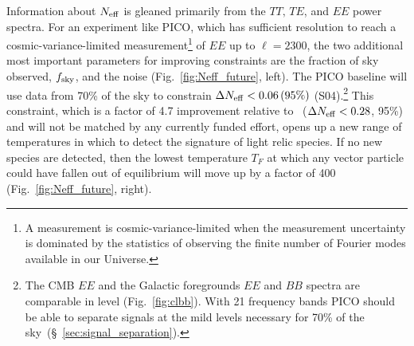 \documentclass[PICOReport.tex]{subfiles}
\begin{document}
Information about ${N_{\rm eff}}$ is gleaned primarily from the $TT,\, TE$, and $EE$ power spectra. For an experiment like PICO, which has sufficient resolution to reach a cosmic-variance-limited measurement\footnote{A measurement is cosmic-variance-limited when the measurement uncertainty is dominated by the statistics of observing the finite number of Fourier modes available in our Universe.} of $EE$ up to $\ell =2300$, the two additional most important parameters for improving constraints are the fraction of sky observed, $f_{\rm sky}$, and the noise (Fig.~\ref{fig:Neff_future}, left). The PICO baseline will use data from 70\% of the sky to constrain $\Delta {N_{\rm eff}} < 0.06 \, (95\%)$ (S04).\footnote{The CMB $EE$ and the Galactic foregrounds $EE$ and $BB$ spectra are comparable in level (Fig.~\ref{fig:clbb}). With 21 frequency bands PICO should be able to separate signals at the mild levels necessary for 70\% of the sky~(\S~\ref{sec:signal_separation}).} This constraint, which is a factor of 4.7 improvement relative to \planck~($\Delta {N_{\rm eff}} < 0.28$, 95\%) and will not be matched by any currently funded effort, opens up a new range of temperatures in which to detect the signature of light relic species. If no new species are detected, then the lowest temperature $T_{F}$ at which any %
vector particle could have fallen out of equilibrium will move up by a factor of 400 (Fig.~\ref{fig:Neff_future}, right). 
\end{document}

